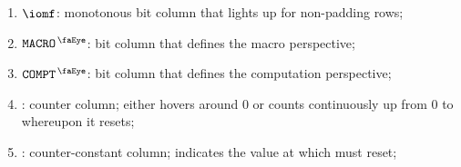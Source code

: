 \begin{enumerate}
    \item $\iomf$:
	monotonous bit column that lights up for non-padding rows;
    \item $\isRlpUtilsMacro$:
	bit column that defines the macro perspective;
	\item $\isRlpUtilsCompt$:
	bit column that defines the computation perspective;
    \item \ct{}:
	counter column; 
	either hovers around $0$ or counts continuously up from $0$ to \maxCt{} whereupon it resets;
    \item \maxCt:
	counter-constant column;
	indicates the value at which \ct{} must reset;
\end{enumerate}
